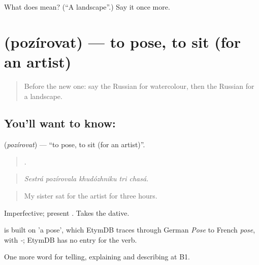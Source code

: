 \begin{tcolorbox}[breakable,colback=teal!4,colframe=teal!35!black,title={Before you move on}]
What does  mean? (\textquotedblleft{}A landscape\textquotedblright{}.) Say it once more.
\end{tcolorbox}
\section[\texorpdfstring{\ru{позировать} (pozírovat)}{позировать (pozírovat)}]{ (pozírovat) — to pose, to sit (for an artist)}

\label{lesson:RU-C521-pozirovat}



\begin{quote}
Before the new one: say the Russian for watercolour, then the Russian for a landscape.
\end{quote}

\subsection*{You'll want to know: }
\textbf{} (\emph{pozírovat}) — \textquotedblleft{}to pose, to sit (for an artist)\textquotedblright{}.

\begin{quote}
    .
\end{quote}

\begin{quote}
\emph{Sestrá pozírovala khudózhniku tri chasá.}
\end{quote}

\begin{quote}
My sister sat for the artist for three hours.
\end{quote}

Imperfective; present . Takes the dative.

\begin{cousinweb}
\emph{} is built on \emph{} 'a pose', which EtymDB traces through German \emph{Pose} to French \emph{pose}, with \emph{-}; EtymDB has no entry for the verb.
\end{cousinweb}

\begin{grammarlens}[title={What you've built}]
One more word for telling, explaining and describing at B1.
\end{grammarlens}

